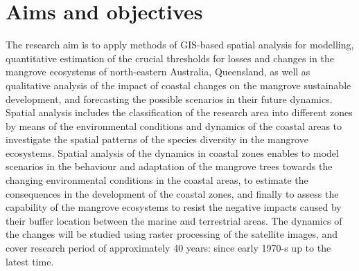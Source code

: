\documentclass[11pt]{paper}
\begin{document}
\section{Aims and objectives}
The research aim is to apply methods of GIS-based spatial analysis for modelling, quantitative estimation of the crucial thresholds for losses and changes in the mangrove ecosystems of north-eastern Australia, Queensland, as well as qualitative analysis of the impact of coastal changes on the mangrove sustainable development, and forecasting the possible scenarios in their future dynamics. Spatial analysis includes the classification of the research area into different zones by means of the environmental conditions and dynamics of the coastal areas to investigate the spatial patterns of the species diversity in the mangrove ecosystems. Spatial analysis of the dynamics in coastal zones enables to model scenarios in the behaviour and adaptation of the mangrove trees towards the changing environmental conditions in the coastal areas, to estimate the consequences in the development of the coastal zones, and finally to assess the capability of the mangrove ecosystems to resist the negative impacts caused by their buffer location between the marine and terrestrial areas. The dynamics of the changes will be studied using raster processing of the satellite images, and cover research period of approximately 40 years: since early 1970-s up to the latest time.
\end{document}
